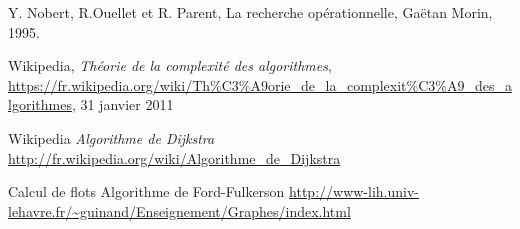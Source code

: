 \begin{thebibliography}{9}

    Y. Nobert, R.Ouellet et R. Parent,
    La recherche opérationnelle,
    Gaëtan Morin,
    1995.

    Wikipedia,
    \emph{Théorie de la complexité des algorithmes},
    \url{https://fr.wikipedia.org/wiki/Th\%C3\%A9orie_de_la_complexit\%C3\%A9_des_algorithmes},
    31 janvier 2011

  Wikipedia
  \emph{Algorithme de Dijkstra}
  \url{http://fr.wikipedia.org/wiki/Algorithme_de_Dijkstra}

Calcul de flots
Algorithme de Ford-Fulkerson
\url{http://www-lih.univ-lehavre.fr/~guinand/Enseignement/Graphes/index.html}

\end{thebibliography}
